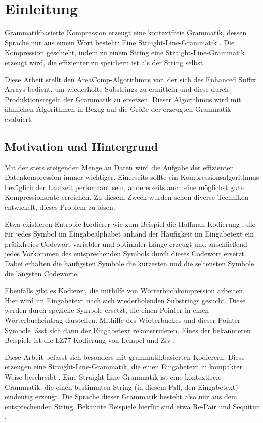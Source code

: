 \chapter{Einleitung}

Grammatikbasierte Kompression erzeugt eine kontextfreie Grammatik, dessen Sprache nur aus einem Wort besteht: Eine Straight-Line-Grammatik \cite{benz_effective_2013}. Die Kompression geschieht, indem zu einem String eine Straight-Line-Grammatik erzeugt wird, die effizienter zu speichern ist als der String selbst.

Diese Arbeit stellt den AreaComp-Algorithmus vor, der sich des Enhanced Suffix Arrays bedient, um wiederholte Substrings zu ermitteln und diese durch Produktionsregeln der Grammatik zu ersetzen.
Dieser Algorithmus wird mit ähnlichen Algorithmen in Bezug auf die Größe der erzeugten Grammatik evaluiert.

\section{Motivation und Hintergrund}

Mit der stets steigenden Menge an Daten wird die Aufgabe der effizienten Datenkompression immer wichtiger. Einerseits sollte ein Kompressionsalgorithmus bezüglich der Laufzeit performant sein, andererseits auch eine möglichst gute Kompressionsrate erreichen. 
Zu diesem Zweck wurden schon diverse Techniken entwickelt, dieses Problem zu lösen. 

Etwa existieren Entropie-Kodierer wie zum Beispiel die Huffman-Kodierung \cite{huffman_method_1952}, die für jedes Symbol im Eingabealphabet anhand der Häufigkeit im Eingabetext ein präfixfreies Codewort variabler und optimaler Länge erzeugt und anschließend jedes Vorkommen des entsprechenden Symbols durch dieses Codewort ersetzt. 
Dabei erhalten die häufigsten Symbole die kürzesten und die seltensten Symbole die längsten Codeworte.

Ebenfalls gibt es Kodierer, die mithilfe von Wörterbuchkompression arbeiten. Hier wird im Eingabetext nach sich wiederholenden Substrings gesucht. Diese werden durch spezielle Symbole ersetzt, die einen Pointer in einen Wörterbucheintrag darstellen. 
Mithilfe des Wörterbuches und dieser Pointer-Symbole lässt sich dann der Eingabetext rekonstruieren.
Eines der bekannteren Beispiele ist die LZ77-Kodierung von Lempel und Ziv \cite{ziv_universal_1977}.

Diese Arbeit befasst sich besonders mit grammatikbasierten Kodierern. Diese erzeugen eine Straight-Line-Grammatik, die einen Eingabetext in kompakter Weise beschreibt \cite{kieffer_grammar-based_2000}. 
Eine Straight-Line-Grammatik ist eine kontextfreie Grammatik, die einen bestimmten String (in diesem Fall, den Eingabetext) eindeutig erzeugt. Die Sprache dieser Grammatik besteht also nur aus dem entsprechenden String. Bekannte Beispiele hierfür sind etwa Re-Pair \cite{larsson_offline_1999} und Sequitur \cite{nevill-manning_identifying_1997}.

